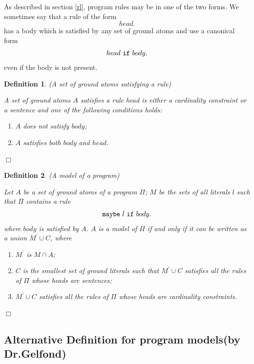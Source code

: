\documentclass[a4paper,10pt]{article}
\newtheorem{definition}{Definition}
\begin{document}
As described in section \ref{rl}, program rules may be in one of the two forms. We sometimes say that a rule of the form $$head.$$ has a body which is satisfied by any set of ground atoms and use a canonical form $$head~\mbox{\texttt{if}}~body.$$ even if the body is not present.



\begin{definition}(A set of ground atoms satisfying a rule)\\
\rm{
A set of ground atoms $A$ satisfies a rule 
 head is either a cardinality constraint or a sentence and one of the following conditions holds:
\begin{enumerate}
\item $A$ does not satisfy $body$;
\item $A$ satisfies both $body$ and $head$.
\end{enumerate}
}
\hfill $\Box$
\end{definition}






\begin{definition}(A model of a program)\\
\rm{
Let $A$ be a set of ground atoms of a program $\Pi$; $M$ be the sets of all literals $l$ such that $\Pi$ contains a rule
$$\mbox{\texttt{maybe}}~l~\mbox{\texttt{if}}~body.$$ where $body$ is satisfied by $A$.
$A$ is a model of $\Pi$ if and only if it can be written as a union  $M^\prime \cup C$, where
\begin{enumerate}
\item $M^\prime$ is $M \cap A$;
\item $C$ is the smallest set of ground literals such that $M^\prime \cup C$ satisfies all the rules of $\Pi$ whose heads are sentences;
\item $M^\prime \cup C$ satisfies all the rules of $\Pi$ whose heads are cardinality constraints.
\end{enumerate}
}
\hfill $\Box$
\end{definition}
\subsection*{Alternative Definition for program models(by Dr.Gelfond)}
\end{document}
